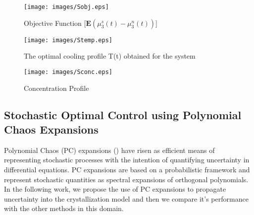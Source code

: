 \documentclass[3p,times,authoryear]{elsarticle}
\begin{document}
\begin{figure}[h!]

\begin{center}
\texttt{[image: images/Sobj.eps]}
\end{center}
\caption{Objective Function [$\mathbf{E}(\mu_{3}^{s}(t) - \mu_{3}^{n}(t))$]} \label{Sobj}
\end{figure}
\begin{figure}[h!] 

\begin{center}
\texttt{[image: images/Stemp.eps]}
\end{center}
\caption{The optimal cooling profile T(t) obtained for the system} \label{Stemp}
\end{figure}

\begin{figure}[h!] 

\begin{center}
\texttt{[image: images/Sconc.eps]}
\end{center}
\caption{Concentration Profile}
\end{figure}


\subsection{Stochastic Optimal Control using Polynomial Chaos Expansions} \label{PCE}

Polynomial Chaos (PC) expansions (\cite{wiener}) have risen as efficient means of representing stochastic processes with the intention of quantifying uncertainty in differential equations. PC expansions are based on a probabilistic framework and represent stochastic quantities as spectral expansions of orthogonal polynomials. In the following work, we propose the use of PC expansions to propagate uncertainty into the crystallization model and then we compare it's performance with the other methods in this domain. 
\end{document}
